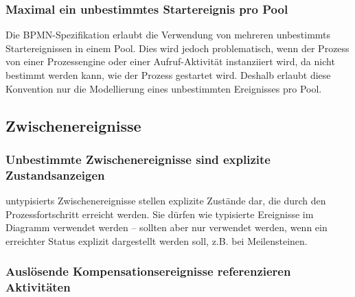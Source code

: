 \documentclass[12pt,report]{../../Templates/snetTeaching}
\begin{document}
\begin{Rahmen}
	\hfill
\end{Rahmen}



\subsubsection{Maximal ein unbestimmtes Startereignis pro Pool}

Die BPMN-Spezifikation erlaubt die Verwendung von mehreren \glspl{unbestimmt} Startereignissen in einem Pool. Dies wird jedoch problematisch, wenn der Prozess von einer Prozessengine oder einer Aufruf-Aktivität instanziiert wird, da nicht bestimmt werden kann, wie der Prozess gestartet wird. Deshalb erlaubt diese Konvention nur die Modellierung eines unbestimmten Ereignisses pro Pool.

\begin{Rahmen}
	\hfill
\end{Rahmen}


\clearpage
\subsection{Zwischenereignisse}

\subsubsection{Unbestimmte Zwischenereignisse sind explizite Zustandsanzeigen}

\Glspl{untypisiert} Zwischenereignisse stellen explizite Zustände dar, die durch den Prozessfortschritt erreicht werden. Sie dürfen wie typisierte Ereignisse im Diagramm verwendet werden -- sollten aber nur verwendet werden, wenn ein erreichter Status explizit dargestellt werden soll, z.B. bei Meilensteinen.

\begin{Rahmen}
\end{Rahmen}




\subsubsection{Auslösende Kompensationsereignisse referenzieren Aktivitäten}
\end{document}

